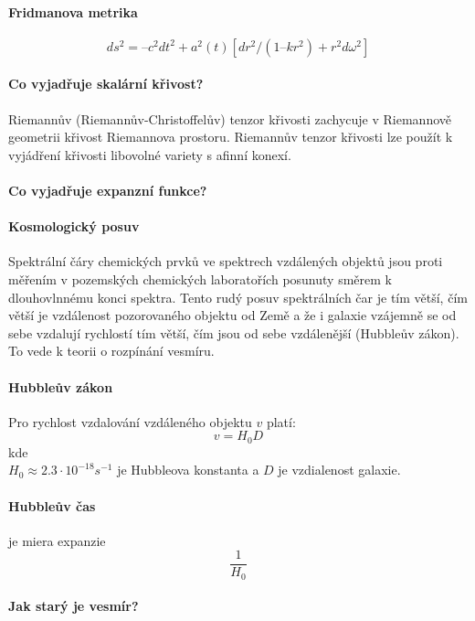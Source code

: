 \documentclass[11pt,a4paper,notitlepage,twocolumn]{article}
\begin{document}
\paragraph{Fridmanova metrika}
\[ ds^2 = – c^2 dt^2+ a^2(t) [ dr^2/(1 – kr^2) +  r^2d\omega^2 ] \]
\paragraph{Co vyjadřuje skalární křivost?}
Riemannův (Riemannův-Christoffelův) tenzor křivosti zachycuje v Riemannově geometrii křivost Riemannova prostoru. Riemannův tenzor křivosti lze použít k vyjádření křivosti libovolné variety s afinní konexí.

\paragraph{Co vyjadřuje expanzní funkce?}
\paragraph{Kosmologický posuv}
Spektrální čáry chemických prvků ve spektrech vzdálených objektů jsou proti měřením v pozemských chemických laboratořích posunuty směrem k dlouhovlnnému konci spektra. Tento rudý posuv spektrálních čar je tím větší, čím větší je vzdálenost pozorovaného objektu od Země a že i galaxie vzájemně se od sebe vzdalují rychlostí tím větší, čím jsou od sebe vzdálenější (Hubbleův zákon). To vede k teorii o rozpínání vesmíru.
\paragraph{Hubbleův zákon}
Pro rychlost vzdalování vzdáleného objektu $ v $  platí:
\[v = H_0D\]
kde\\
$ H_0 \approx 2.3 \cdot 10^{-18} s^{-1}$ je Hubbleova konstanta  a $ D $ je vzdialenost galaxie.

\paragraph{Hubbleův čas} je miera expanzie 
\[ \frac{1}{H_0}\]
\paragraph{Jak starý je vesmír?}
\end{document}
